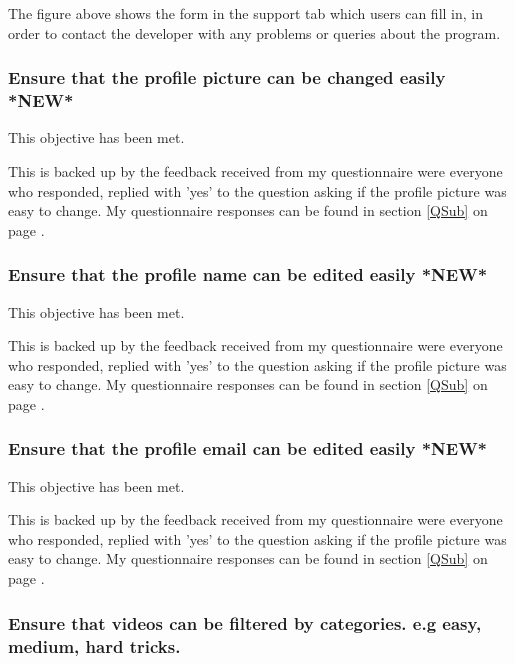 The figure above shows the form in the support tab which users can fill in, in order to contact the developer with any problems or queries about the program.



\subsubsection {Ensure that the profile picture can be changed easily *NEW*} 

This objective has been met.

This is backed up by the feedback received from my questionnaire were everyone who responded, replied with 'yes' to the question asking if the profile picture was easy to change. My questionnaire responses can be found in section \ref{QSub} on page \pageref{QSub}.



\subsubsection {Ensure that the profile name can be edited easily *NEW*} %

This objective has been met.

This is backed up by the feedback received from my questionnaire were everyone who responded, replied with 'yes' to the question asking if the profile picture was easy to change. My questionnaire responses can be found in section \ref{QSub} on page \pageref{QSub}.



\subsubsection {Ensure that the profile email can be edited easily *NEW*} %

This objective has been met.

This is backed up by the feedback received from my questionnaire were everyone who responded, replied with 'yes' to the question asking if the profile picture was easy to change. My questionnaire responses can be found in section \ref{QSub} on page \pageref{QSub}.




\subsubsection {Ensure that videos can be filtered by categories. e.g easy, medium, hard tricks.}

